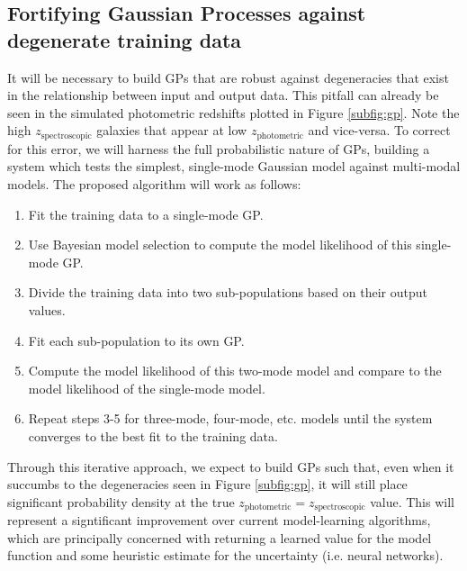 \documentclass[prd,nofootbib,floatfix,11pt,tightenlines]{revtex4}
\begin{document}
\subsection{Fortifying Gaussian Processes against degenerate training data}
\label{sec:multimode}

It will be necessary to build GPs that are robust against degeneracies
that exist in the relationship between input and output
data.  This pitfall can already be seen in the simulated photometric redshifts
plotted in Figure \ref{subfig:gp}.  Note the high
$z_\text{spectroscopic}$ galaxies that appear at low $z_\text{photometric}$ and
vice-versa.  To correct for this error, we will harness the full probabilistic
nature of GPs, building a system which tests the simplest, single-mode Gaussian
model against multi-modal models.  The proposed algorithm will work as
follows:
\vspace{.5\baselineskip}
\begin{enumerate}
\item Fit the training data to a single-mode GP.

\item Use Bayesian model selection \cite{mackay}
to compute the model likelihood of this single-mode GP.

\item Divide the training data into two sub-populations based on their output
values.

\item Fit each sub-population to its own GP.

\item Compute the model likelihood of this two-mode model and compare to the
model likelihood of the single-mode model.

\item Repeat steps 3-5 for three-mode, four-mode, etc. models until
  the system converges to the best fit to the training data.
\end{enumerate}

\vspace{.5\baselineskip}
Through this iterative approach, we expect to build  GPs such that, even when it
succumbs to the degeneracies seen in Figure \ref{subfig:gp}, it will still place
significant probability density at the true
$z_\text{photometric}=z_\text{spectroscopic}$ value.  This will represent a
signtificant improvement over current model-learning algorithms, which are
principally concerned with returning a learned value for the model function and
some heuristic estimate for the uncertainty (i.e. neural networks).
\end{document}
